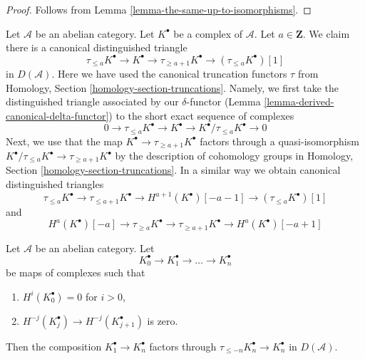 \begin{proof}
Follows from
Lemma \ref{lemma-the-same-up-to-isomorphisms}.
\end{proof}

\begin{remark}
\label{remark-truncation-distinguished-triangle}
Let $\mathcal{A}$ be an abelian category. Let $K^\bullet$ be a complex
of $\mathcal{A}$. Let $a \in \mathbf{Z}$. We claim there is a canonical
distinguished triangle
$$
\tau_{\leq a}K^\bullet \to K^\bullet \to \tau_{\geq a + 1}K^\bullet \to
(\tau_{\leq a}K^\bullet)[1]
$$
in $D(\mathcal{A})$. Here we have used the canonical truncation functors $\tau$
from Homology, Section \ref{homology-section-truncations}.
Namely, we first take the distinguished
triangle associated by our $\delta$-functor
(Lemma \ref{lemma-derived-canonical-delta-functor})
to the short exact sequence of complexes
$$
0 \to \tau_{\leq a}K^\bullet \to K^\bullet \to
K^\bullet/\tau_{\leq a}K^\bullet \to 0
$$
Next, we use that the map $K^\bullet \to \tau_{\geq a + 1}K^\bullet$
factors through a quasi-isomorphism
$K^\bullet/\tau_{\leq a}K^\bullet \to \tau_{\geq a + 1}K^\bullet$
by the description of cohomology groups in
Homology, Section \ref{homology-section-truncations}.
In a similar way we obtain canonical distinguished triangles
$$
\tau_{\leq a}K^\bullet \to \tau_{\leq a + 1}K^\bullet \to
H^{a + 1}(K^\bullet)[-a-1] \to (\tau_{\leq a}K^\bullet)[1]
$$
and
$$
H^a(K^\bullet)[-a] \to \tau_{\geq a}K^\bullet \to \tau_{\geq a + 1}K^\bullet
\to H^a(K^\bullet)[-a + 1]
$$
\end{remark}

\begin{lemma}
\label{lemma-trick-vanishing-composition}
Let $\mathcal{A}$ be an abelian category. Let
$$
K_0^\bullet \to K_1^\bullet \to \ldots \to K_n^\bullet
$$
be maps of complexes such that
\begin{enumerate}
\item $H^i(K_0^\bullet) = 0$ for $i > 0$,
\item $H^{-j}(K_j^\bullet) \to H^{-j}(K_{j + 1}^\bullet)$ is zero.
\end{enumerate}
Then the composition $K_1^\bullet \to K_n^\bullet$ factors through
$\tau_{\leq -n}K_n^\bullet \to K_n^\bullet$ in $D(\mathcal{A})$.
\end{lemma}

